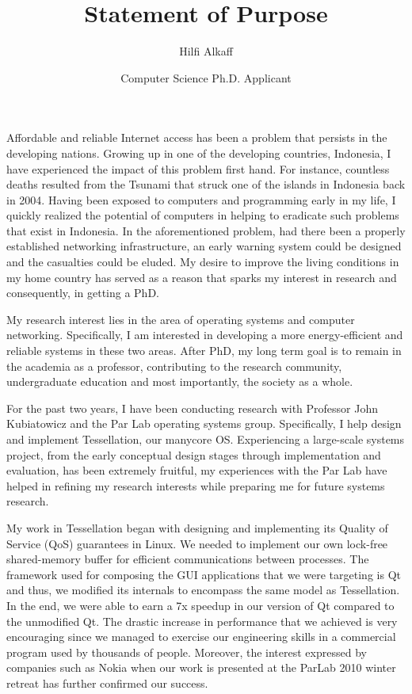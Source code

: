 \documentclass[11pt]{article}
\title{Statement of Purpose}
\author{Hilfi Alkaff}
\date{Computer Science Ph.D. Applicant}
\begin{document}
  \maketitle%

Affordable and reliable Internet access has been a problem that persists in the developing nations. Growing up in one of the developing countries, Indonesia, I have experienced the impact of this problem first hand. For instance, countless deaths resulted from the Tsunami that struck one of the islands in Indonesia back in 2004. Having been exposed to computers and programming early in my life, I quickly realized the potential of computers in helping to eradicate such problems that exist in Indonesia. In the aforementioned problem, had there been a properly established networking infrastructure, an early warning system could be designed and the casualties could be eluded. My desire to improve the living conditions in my home country has served as a reason that sparks my interest in research and consequently, in getting a PhD. \newline

My research interest lies in the area of operating systems and computer networking. Specifically, I am interested in developing a more energy-efficient and reliable systems in these two areas. After PhD, my long term goal is to remain in the academia as a professor, contributing to the research community, undergraduate education and most importantly, the society as a whole. \newline

For the past two years, I have been conducting research with Professor John Kubiatowicz and the Par Lab operating systems group. Specifically, I help design and implement Tessellation, our manycore OS. Experiencing a large-scale systems project, from the early conceptual design stages through implementation and evaluation, has been extremely fruitful, my experiences with the Par Lab have helped in refining my research interests while preparing me for future systems research. \newline

My work in Tessellation began with designing and implementing its Quality of Service (QoS) guarantees in Linux. We needed to implement our own lock-free shared-memory buffer for efficient communications between processes. The framework used for composing the GUI applications that we were targeting is Qt and thus, we modified its internals to encompass the same model as Tessellation. In the end, we were able to earn a 7x speedup in our version of Qt compared to the unmodified Qt. The drastic increase in performance that we achieved is very encouraging since we managed to exercise our engineering skills in a commercial program used by thousands of people. Moreover, the interest expressed by companies such as Nokia when our work is presented at the ParLab 2010 winter retreat has further confirmed our success. \newline
\end{document}
